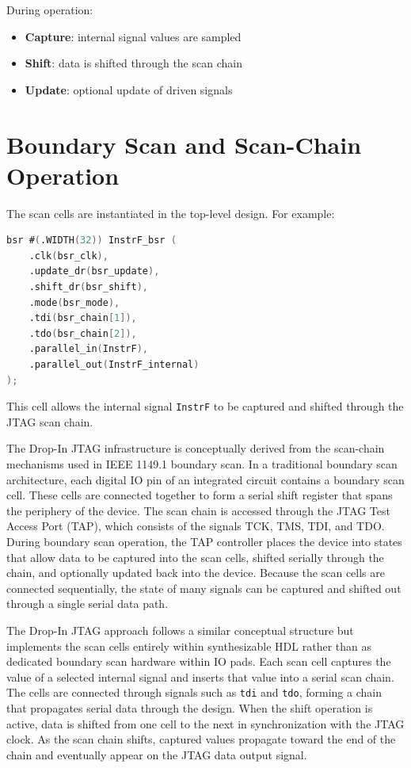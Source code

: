 \documentclass[10pt]{article}
\begin{document}
During operation:

\begin{itemize}
\item \textbf{Capture}: internal signal values are sampled
\item \textbf{Shift}: data is shifted through the scan chain
\item \textbf{Update}: optional update of driven signals
\end{itemize}

\section{Boundary Scan and Scan-Chain Operation}

The scan cells are instantiated in the top-level design. For example:
\begin{lstlisting}[language=Verilog, basicstyle=\ttfamily\small]
bsr #(.WIDTH(32)) InstrF_bsr (
    .clk(bsr_clk),
    .update_dr(bsr_update),
    .shift_dr(bsr_shift),
    .mode(bsr_mode),
    .tdi(bsr_chain[1]),
    .tdo(bsr_chain[2]),
    .parallel_in(InstrF),
    .parallel_out(InstrF_internal)
);
\end{lstlisting}
This cell allows the internal signal \texttt{InstrF} to be captured and shifted through the JTAG scan chain.

The Drop-In JTAG infrastructure is conceptually derived from the scan-chain mechanisms used in IEEE 1149.1 boundary scan. In a traditional boundary scan architecture, each digital IO pin of an integrated circuit contains a boundary scan cell. These cells are connected together to form a serial shift register that spans the periphery of the device. The scan chain is accessed through the JTAG Test Access Port (TAP), which consists of the signals TCK, TMS, TDI, and TDO. During boundary scan operation, the TAP controller places the device into states that allow data to be captured into the scan cells, shifted serially through the chain, and optionally updated back into the device. Because the scan cells are connected sequentially, the state of many signals can be captured and shifted out through a single serial data path.

The Drop-In JTAG approach follows a similar conceptual structure but implements the scan cells entirely within synthesizable HDL rather than as dedicated boundary scan hardware within IO pads. Each scan cell captures the value of a selected internal signal and inserts that value into a serial scan chain. The cells are connected through signals such as \texttt{tdi} and \texttt{tdo}, forming a chain that propagates serial data through the design. When the shift operation is active, data is shifted from one cell to the next in synchronization with the JTAG clock. As the scan chain shifts, captured values propagate toward the end of the chain and eventually appear on the JTAG data output signal.
\end{document}
